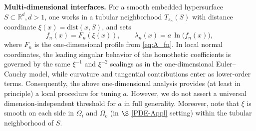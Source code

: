 \documentclass[preprint,12pt]{elsarticle}
\theoremstyle{plain}
\theoremstyle{definition}
\theoremstyle{note}
\newcommand{\R}{\mathbb{R}}
\begin{document}
\medskip
\noindent\textbf{Multi-dimensional interfaces.}
For a smooth embedded hypersurface $S\subset\R^d, d>1$, one works in a tubular neighborhood $T_{\varepsilon_n}(S)$ with distance coordinate $\xi(x)=\mathrm{dist}(x,S)$, and sets
\[
f_n(x)=F_n(\xi(x)), \qquad \lambda_n(x)=a\,\ln\!\bigl(f_n(x)\bigr),
\]
where $F_n$ is the one-dimensional profile from \eqref{eq:A_fn}. In local normal coordinates, the leading singular behavior of the homothetic coefficients is governed by the same $\xi^{-1}$ and $\xi^{-2}$ scalings as in the one-dimensional Euler--Cauchy model, while curvature and tangential contributions enter as lower-order terms. Consequently, the above one-dimensional analysis provides (at least in principle) a local procedure for tuning $a$. However, we do not assert a universal dimension-independent threshold for $a$ in full generality. Moreover, note that $\xi$ is smooth on each side in $\Omega_i$ and $\Omega_o$ (in $\S$ \ref{PDE-Appl} setting) within the tubular neighborhood of $S$.
\end{document}
